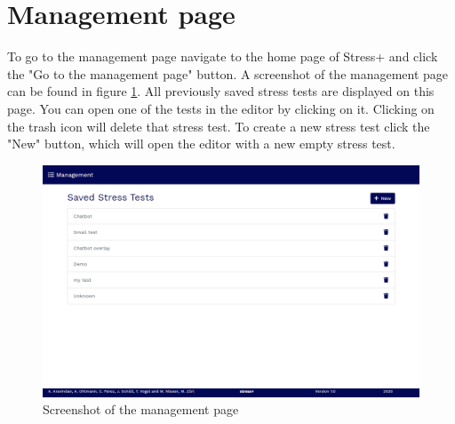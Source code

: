 \section{Management page}
\label{sec:management-page}

To go to the management page navigate to the home page of Stress+ and click the "Go to the management page" button.
A screenshot of the management page can be found in figure \ref{fig:screenshot-management-page}.
All previously saved stress tests are displayed on this page.
You can open one of the tests in the editor by clicking on it.
Clicking on the trash icon will delete that stress test.
To create a new stress test click the "New" button, which will open the editor with a new empty stress test.

\begin{figure}[htb]
    \centering
    \includegraphics[width=\textwidth]{figures/screenshot-management-page.png}
    \caption{Screenshot of the management page}
    \label{fig:screenshot-management-page}
\end{figure}
